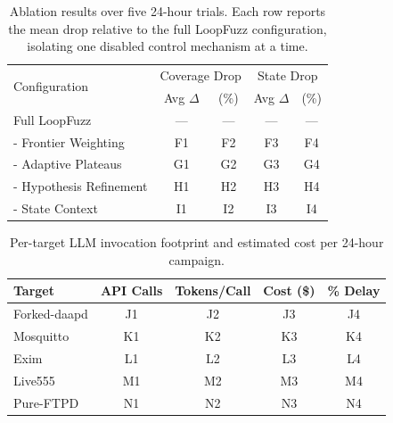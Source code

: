 \begin{table}[htbp]
\centering
\caption{Ablation results over five 24-hour trials. Each row reports the mean drop relative to the full LoopFuzz configuration, isolating one disabled control mechanism at a time.}
\label{tab:ablation}
\small
\begin{tabular}{l|cc|cc}
\toprule
\multirow{2}{*}{Configuration} & \multicolumn{2}{c|}{Coverage Drop} & \multicolumn{2}{c}{State Drop} \\
& Avg $\Delta$ & (\%) & Avg $\Delta$ & (\%) \\
\midrule
Full LoopFuzz      & --- & --- & --- & --- \\
- Frontier Weighting  & F1  & F2  & F3  & F4  \\
- Adaptive Plateaus   & G1  & G2  & G3  & G4  \\
- Hypothesis Refinement & H1 & H2 & H3 & H4 \\
- State Context       & I1  & I2  & I3  & I4  \\
\bottomrule
\end{tabular}
\normalsize
\end{table}


\begin{table}[htbp]
\centering
\caption{Per-target LLM invocation footprint and estimated cost per 24-hour campaign.}
\label{tab:cost}
\footnotesize
\begin{tabular}{l|c c c|c}
\toprule
Target & API Calls & Tokens/Call & Cost (\$) & \% Delay \\
\midrule
Forked-daapd & J1 & J2 & J3 & J4 \\
Mosquitto    & K1 & K2 & K3 & K4 \\
Exim         & L1 & L2 & L3 & L4 \\
Live555      & M1 & M2 & M3 & M4 \\
Pure-FTPD    & N1 & N2 & N3 & N4 \\
\bottomrule
\end{tabular}
\normalsize
\end{table}

